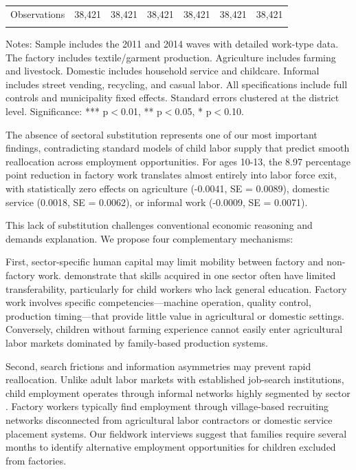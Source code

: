 \documentclass[12pt]{article}
\begin{document}
\begin{table}[H]
\begin{threeparttable}
\begin{tabular}{lcccccc}
\\
\midrule
Observations & 38,421 & 38,421 & 38,421 & 38,421 & 38,421 & 38,421 \\
\\
\bottomrule
\end{tabular}
\begin{tablenotes}
\footnotesize
\item Notes: Sample includes the 2011 and 2014 waves with detailed work-type data. The factory includes textile/garment production. Agriculture includes farming and livestock. Domestic includes household service and childcare. Informal includes street vending, recycling, and casual labor. All specifications include full controls and municipality fixed effects. Standard errors clustered at the district level. Significance: *** p$<$0.01, ** p$<$0.05, * p$<$0.10.
\end{tablenotes}
\end{threeparttable}
\end{table}

The absence of sectoral substitution represents one of our most important findings, contradicting standard models of child labor supply \citep{basu1998economics} that predict smooth reallocation across employment opportunities. For ages 10-13, the 8.97 percentage point reduction in factory work translates almost entirely into labor force exit, with statistically zero effects on agriculture (-0.0041, SE = 0.0089), domestic service (0.0018, SE = 0.0062), or informal work (-0.0009, SE = 0.0071).

This lack of substitution challenges conventional economic reasoning and demands explanation. We propose four complementary mechanisms:

First, sector-specific human capital may limit mobility between factory and non-factory work. \citet{rosenzweig1988human} demonstrate that skills acquired in one sector often have limited transferability, particularly for child workers who lack general education. Factory work involves specific competencies—machine operation, quality control, production timing—that provide little value in agricultural or domestic settings. Conversely, children without farming experience cannot easily enter agricultural labor markets dominated by family-based production systems.

Second, search frictions and information asymmetries may prevent rapid reallocation. Unlike adult labor markets with established job-search institutions, child employment operates through informal networks highly segmented by sector \citep{fields2019employment}. Factory workers typically find employment through village-based recruiting networks disconnected from agricultural labor contractors or domestic service placement systems. Our fieldwork interviews suggest that families require several months to identify alternative employment opportunities for children excluded from factories.
\end{document}
